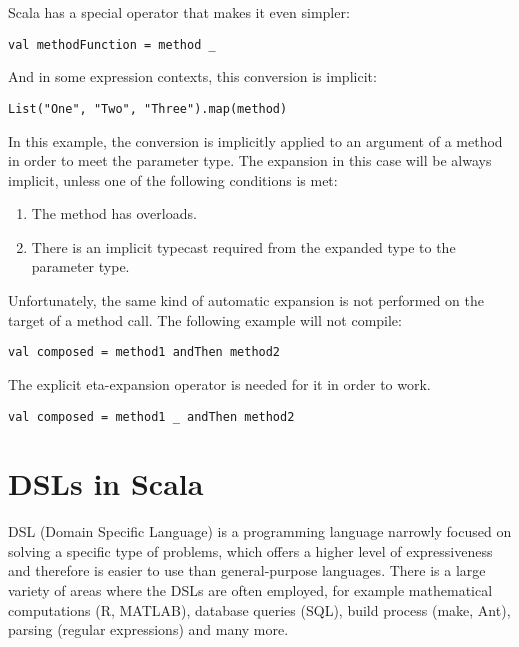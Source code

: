 Scala has a special operator that makes it even simpler:

\lstset{style=Scala}
\begin{lstlisting}
val methodFunction = method _
\end{lstlisting}

And in some expression contexts, this conversion is implicit:

\lstset{style=Scala}
\begin{lstlisting}
List("One", "Two", "Three").map(method)
\end{lstlisting}

In this example, the conversion is implicitly applied to an argument of a method in order to meet the parameter type. The expansion in this case will be always implicit, unless one of the following conditions is met:
\begin{enumerate}
	\item The method has overloads.
	\item There is an implicit typecast required from the expanded type to the parameter type.
\end{enumerate}

Unfortunately, the same kind of automatic expansion is not performed on the target of a method call. The following example will not compile:

\lstset{style=Scala}
\begin{lstlisting}
val composed = method1 andThen method2
\end{lstlisting}

The explicit eta-expansion operator is needed for it in order to work.

\lstset{style=Scala}
\begin{lstlisting}
val composed = method1 _ andThen method2
\end{lstlisting}





\section{DSLs in Scala}
\label{sec:dsls}

DSL (Domain Specific Language) is a programming language narrowly focused on solving a specific type of problems, which offers a higher level of expressiveness and therefore is easier to use than general-purpose languages. There is a large variety of areas where the DSLs are often employed, for example mathematical computations (R, MATLAB), database queries (SQL), build process (make, Ant), parsing (regular expressions) and many more.


